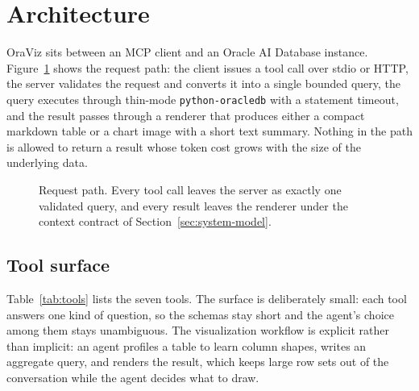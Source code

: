 \section{Architecture}\label{sec:architecture}

OraViz sits between an MCP client and an Oracle AI Database instance. Figure~\ref{fig:architecture} shows the request path: the client issues a tool call over stdio or HTTP, the server validates the request and converts it into a single bounded query, the query executes through thin-mode \texttt{python-oracledb} with a statement timeout, and the result passes through a renderer that produces either a compact markdown table or a chart image with a short text summary. Nothing in the path is allowed to return a result whose token cost grows with the size of the underlying data.

\begin{figure}[t]
\centering
{}
\caption{Request path. Every tool call leaves the server as exactly one validated query, and every result leaves the renderer under the context contract of Section~\ref{sec:system-model}.}
\label{fig:architecture}
\end{figure}

\subsection{Tool surface}

Table~\ref{tab:tools} lists the seven tools. The surface is deliberately small: each tool answers one kind of question, so the schemas stay short and the agent's choice among them stays unambiguous. The visualization workflow is explicit rather than implicit: an agent profiles a table to learn column shapes, writes an aggregate query, and renders the result, which keeps large row sets out of the conversation while the agent decides what to draw.

